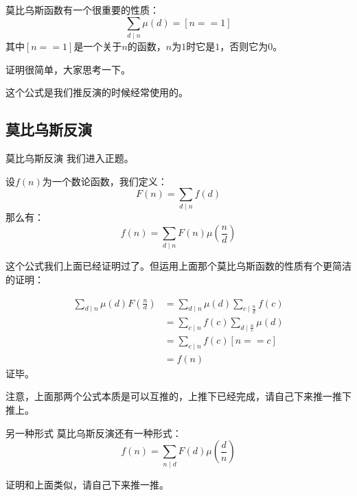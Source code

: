 \documentclass[9pt]{beamer}
\begin{document}
			\begin{frame}
				莫比乌斯函数有一个很重要的性质：
				$$
					\sum_{d \mid n} \mu(d) = [n == 1]
				$$
				其中$[n == 1]$是一个关于$n$的函数，$n$为$1$时它是$1$，否则它为$0$。
				
				\pause
				证明很简单，大家思考一下。
				
				\pause
				这个公式是我们推反演的时候经常使用的。
			\end{frame}
			
			\subsection{莫比乌斯反演}
			\begin{frame}{莫比乌斯反演}
				我们进入正题。
				\begin{theorem}[莫比乌斯反演公式]
					设$f(n)$为一个数论函数，我们定义：
					$$
						F(n) = \sum_{d \mid n} f(d)
					$$
					那么有：
					$$
						f(n) = \sum_{d \mid n} F(n)\mu(\frac{n}{d})
					$$
				\end{theorem}

				
			\end{frame}
			
			\begin{frame}
				这个公式我们上面已经证明过了。但运用上面那个莫比乌斯函数的性质有个更简洁的证明：
				
				\begin{align}
					\sum_{d \mid n} \mu(d) F(\frac{n}{d}) & = \sum_{d \mid n} \mu(d) \sum_{c \mid \frac{n}{d}} f(c)  \\
					& = \sum_{c \mid n} f(c) \sum_{d \mid \frac{n}{c}} \mu(d) \\
					& = \sum_{c \mid n} f(c) [n == c] \\
					& = f(n)
				\end{align}
				证毕。
				
							\pause
				
				注意，上面那两个公式本质是可以互推的，上推下已经完成，请自己下来推一推下推上。
			\end{frame}
			
			\begin{frame}{另一种形式}
				莫比乌斯反演还有一种形式：
				$$
					f(n) = \sum_{n \mid d} F(d)\mu(\frac{d}{n})
				$$
				
							\pause
				
				证明和上面类似，请自己下来推一推。				
			\end{frame}
			
\end{document}
